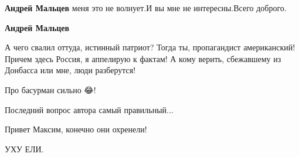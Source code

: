 \begin{itemize}
\begin{itemize}
 
\textbf{Андрей Мальцев} меня это не волнует.И вы мне не интересны.Всего доброго.

 
\textbf{Андрей Мальцев} 

А чего свалил оттуда, истинный патриот? Тогда ты, пропагандист американский! Причем
здесь Россия, я аппелирую к фактам! А кому верить, сбежавшему из Донбасса или
мне, люди разберутся!

\end{itemize}

 
Про басурман сильно 😂!

 
Последний вопрос автора самый правильный...

 
Привет Максим, конечно они охренели!

 
УХУ ЕЛИ.


\end{itemize}
